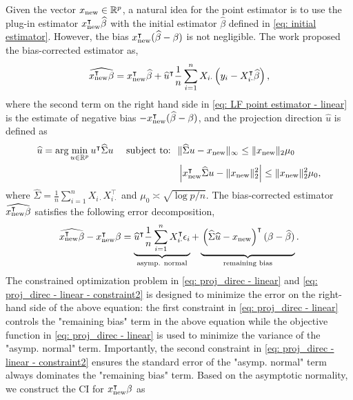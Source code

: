 Given the vector $x_{\rm new} \in \mathbb{R}^p$, a natural idea for the point estimator is to use the plug-in estimator $x_{\rm new}^\intercal \widehat{\beta}$ with the initial estimator $\widehat{\beta}$ defined in \eqref{eq: initial estimator}. However,  the bias $x_{\rm new}^\intercal (\widehat{\beta} -\beta)$ is not negligible. The work \citet{cai2021optimal} proposed the bias-corrected estimator as,
\begin{equation}
    \widehat{x_{\rm new}^\intercal \beta} = x_{\rm new}^\intercal \widehat{\beta} +
    \widehat{u}^\intercal \frac{1}{n} \sum_{i=1}^n X_{i\cdot} \left(y_i - X_{i\cdot}^\intercal \widehat{\beta}\right),
    \label{eq: LF point estimator - linear}
\end{equation}
where the second term on the right hand side in \eqref{eq: LF point estimator - linear} is the estimate of negative bias $- x_{\rm new}^\intercal (\widehat{\beta}-\beta)$, 
and the projection direction $\widehat{u}$ is defined as
\begin{align}
    \widehat{u} = \arg\min_{u \in \mathbb{R}^p} u^\intercal \widehat{\Sigma} u \quad \textrm{ subject to: }
    &\; \|\widehat{\Sigma} u - x_{\rm new}\|_\infty \leq \|x_{\rm new}\|_2 \mu_0 
    \label{eq: proj_direc - linear}\\
    &\; \left\lvert x_{\rm new}^\intercal \widehat{\Sigma} u - \|x_{\rm new}\|^2_2 \right\rvert \leq \|x_{\rm new}\|^2_2 \mu_0, \label{eq: proj_direc - linear - constraint2}
\end{align}
where $\widehat{\Sigma} = \frac{1}{n}\sum_{i=1}^n X_{i\cdot} X_{i\cdot}^\intercal$ and $\mu_0 \asymp \sqrt{\log p/n}$. The bias-corrected estimator $\widehat{x_{\rm new}^\intercal \beta}$ satisfies the following error decomposition,
\begin{equation}
    \widehat{\xnew^\intercal \beta} - \xnew^\intercal \beta = \underbrace{\widehat{u}^\intercal \frac{1}{n} \sum_{i=1}^n X_{i\cdot}^\intercal \epsilon_i}_\textrm{asymp. normal} + \underbrace{\vphantom{\sum_{i=1}^n}\left(\widehat{\Sigma} \widehat{u} - \xnew \right)^\intercal (\beta - \widehat{\beta})}_\textrm{remaining bias}.
\label{eq: error decomposition}
\end{equation}
The constrained optimization problem in \eqref{eq: proj_direc - linear} and \eqref{eq: proj_direc - linear - constraint2} is designed to minimize the error on the right-hand side of the above equation: the first constraint in \eqref{eq: proj_direc - linear} controls the "remaining bias" term in the above equation while the objective function in \eqref{eq: proj_direc - linear} is used to minimize the variance of the "asymp. normal" term. Importantly, the second constraint in  \eqref{eq: proj_direc - linear - constraint2} ensures the standard error of the "asymp. normal" term always dominates the "remaining bias" term. Based on the asymptotic normality, we construct the CI for $x_{\rm new}^\intercal \beta$ as 
